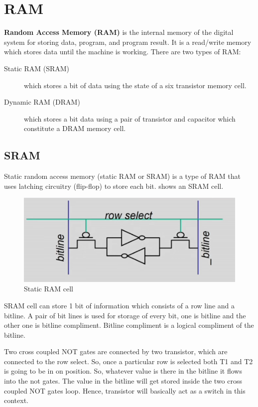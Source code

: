\section{RAM}
\textbf{Random Access Memory (RAM)} is the internal memory of the digital system for storing data, program, and program result. It is a read/write memory which stores data until the machine is working. There are two types of RAM:

\begin{description}
    \item[Static RAM (SRAM)] which stores a bit of data using the state of a six transistor memory cell.
    \item[Dynamic RAM (DRAM)] which stores a bit data using a pair of transistor and capacitor which constitute a DRAM memory cell.
\end{description}

\subsection{SRAM}
Static random access memory (static RAM or SRAM) is a type of RAM that uses latching circuitry (flip-flop) to store each bit.  shows an SRAM cell.

\begin{figure}[H]
	\begin{center}
		\includegraphics[width=5in]{images/SRAM.png}
		\caption{Static RAM cell}
		\label{SRAM}
	\end{center}
\end{figure}

SRAM cell can store 1 bit of information which consists of a row line and a bitline. A pair of bit lines is used for storage of every bit, one is bitline and the other one is bitline compliment. Bitline compliment is a logical compliment of the bitline. 

\par Two cross coupled NOT gates are connected by two transistor, which are connected to the row select. So, once a particular row is selected both T1 and T2 is going to be in on position. So, whatever value is there in the bitline it flows into the not gates. The value in the bitline will get stored inside the two cross coupled NOT gates loop.
Hence, transistor will basically act as a switch in this context.

